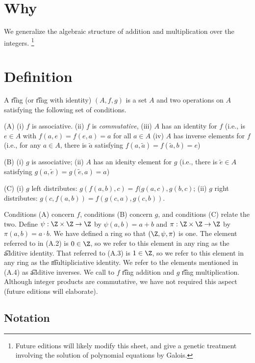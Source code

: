 
\section*{Why}

We generalize the algebraic structure of addition and multiplication over the integers.
  \ifhmode\unskip\fi\footnote{
Future editions will likely modify this sheet, and give a genetic treatment involving the solution of polynomial equations by Galois.
  }

\section*{Definition}

A \t{ring} (or \t{ring with identity}) $(A, f, g)$ is a set $A$ and two operations on $A$ satisfying the following set of conditions.

(A)
(i) $f$ is associative.
(ii) $f$ is \textit{commutative},
(iii) $A$ has an identity for $f$ (i.e., is $e \in A$ with $f(a, e) = f(e, a) = a$ for all $a \in A$
(iv) $A$ has inverse elements for $f$ (i.e., for any $a \in A$, there is $\tilde{a} $ satisfying $f(a,\tilde{a}) = f(\tilde{a}, b) = e$)

(B)
(i) $g$ is associative;
(ii) $A$ has an idenity element for $g$ (i.e., there is $\tilde{e} \in A$ satisfying $g(a, \tilde{e}) = g(\tilde{e},a) = a$)

(C)
(i) $g$ left distributes: $g(f(a, b), c) = f(g(a,c), g(b,c)$;
(ii) $g$ right distributes: $g(c,f(a,b)) = f(g(c,a), g(c,b))$.

Conditions (A) concern $f$, conditions (B) concern $g$, and conditions (C) relate the two.
Define $\psi : \Z  \times \Z  \to \Z $ by $\psi (a, b) = a+b$ and $\pi : \Z  \times \Z  \to \Z $ by $\pi(a, b) = a\cdot b$.
We have defined a ring so that $(\Z , \psi , \pi )$ is one.
The element referred to in (A.2) is $0 \in \Z $, so we refer to this element in any ring as the \t{additive identity}.
That referred to (A.3) is $1 \in \Z $, so we refer to this element in any ring as the \t{multipliciative identity}.
We refer to the elements mentioned in (A.4) as \t{additive inverses}.
We call to $f$ \t{ring addition} and $g$ \t{ring multiplication}.
Although integer products are commutative, we have not required this aspect (future editions will elaborate).

\subsection*{Notation}

